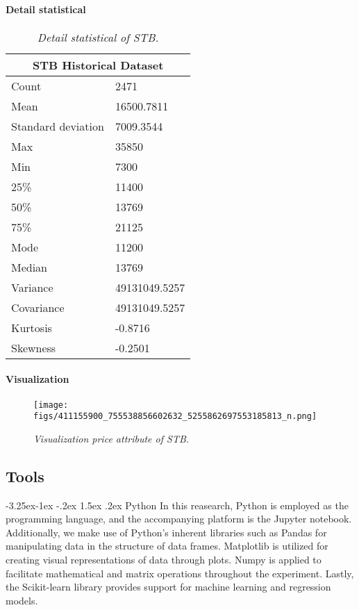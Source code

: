 \documentclass{ieeeojies}
\makeatletter
\renewcommand\subsubsection{\@startsection{subsubsection}{3}{\z@}%
                                   {-3.25ex\@plus -1ex \@minus -.2ex}%
                                   {1.5ex \@plus .2ex}%
                                   {\normalfont\normalsize\bfseries}}
\makeatother
\begin{document}
\paragraph{Detail statistical}
\begin{table}[H]
    \centering
    \begin{tabular}{|l|l|}
    \hline
        \multicolumn{2}{|c|}{\textbf{STB Historical Dataset}} \\ \hline
        Count & 2471 \\ \hline
        Mean & 16500.7811 \\ \hline
        Standard deviation & 7009.3544 \\ \hline
        Max & 35850 \\ \hline
        Min & 7300 \\ \hline
        25\% & 11400 \\ \hline
        50\% & 13769 \\ \hline
        75\% & 21125 \\ \hline
        Mode & 11200 \\ \hline
        Median & 13769 \\ \hline
        Variance & 49131049.5257 \\ \hline
        Covariance & 49131049.5257 \\ \hline
        Kurtosis & -0.8716 \\ \hline
        Skewness & -0.2501 \\ \hline
    \end{tabular}
    \caption{\centering \textit{Detail statistical of STB.}}
\end{table}

\paragraph{Visualization}

\begin{figure}[H]
    \centering
    \texttt{[image: figs/411155900\_755538856602632\_5255862697553185813\_n.png]}
    \caption{\centering \textit{Visualization price attribute of STB.}}
    \label{fig:enter-label}
\end{figure}

\subsection{Tools}
\subsubsection{Python}
\hspace{0.3cm}In this reasearch, Python is employed as the programming language, and the accompanying platform is the Jupyter notebook. Additionally, we make use of Python's inherent libraries such as Pandas for manipulating data in the structure of data frames. Matplotlib is utilized for creating visual representations of data through plots. Numpy is applied to facilitate mathematical and matrix operations throughout the experiment. Lastly, the Scikit-learn library provides support for machine learning and regression models.
\end{document}
